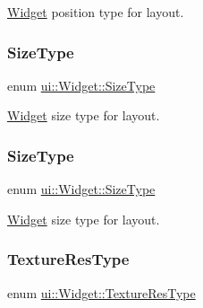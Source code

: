 \hyperlink{classui_1_1Widget}{Widget} position type for layout. \mbox{\label{classui_1_1Widget_ab7035fc10a00c756523be6bc57cf801c}} 
\subsubsection{\texorpdfstring{Size\+Type}{SizeType}\hspace{0.1cm}{\footnotesize\ttfamily [1/2]}}
{\footnotesize\ttfamily enum \hyperlink{classui_1_1Widget_ab7035fc10a00c756523be6bc57cf801c}{ui\+::\+Widget\+::\+Size\+Type}\hspace{0.3cm}{\ttfamily [strong]}}

\hyperlink{classui_1_1Widget}{Widget} size type for layout. \mbox{\label{classui_1_1Widget_ab7035fc10a00c756523be6bc57cf801c}} 
\subsubsection{\texorpdfstring{Size\+Type}{SizeType}\hspace{0.1cm}{\footnotesize\ttfamily [2/2]}}
{\footnotesize\ttfamily enum \hyperlink{classui_1_1Widget_ab7035fc10a00c756523be6bc57cf801c}{ui\+::\+Widget\+::\+Size\+Type}\hspace{0.3cm}{\ttfamily [strong]}}

\hyperlink{classui_1_1Widget}{Widget} size type for layout. \mbox{\label{classui_1_1Widget_a040a65ec5ad3b11119b7e16b98bd9af0}} 
\subsubsection{\texorpdfstring{Texture\+Res\+Type}{TextureResType}\hspace{0.1cm}{\footnotesize\ttfamily [1/2]}}
{\footnotesize\ttfamily enum \hyperlink{classui_1_1Widget_a040a65ec5ad3b11119b7e16b98bd9af0}{ui\+::\+Widget\+::\+Texture\+Res\+Type}\hspace{0.3cm}{\ttfamily [strong]}}

